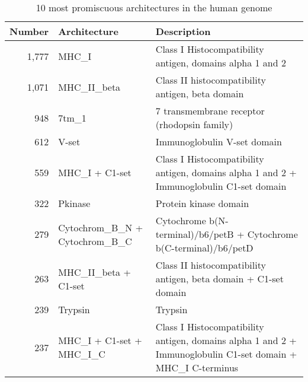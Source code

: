\begin{table}
	\begin{center}
		\sf
		\begin{tabular}{r p{} p{}}
			\textbf{Number} & \textbf{Architecture} & \textbf{Description} \\
			\hline
			1,777  & MHC\_I          & Class I Histocompatibility antigen, domains alpha 1 and 2 \\ 
			1,071  & MHC\_II\_beta    & Class II histocompatibility antigen, beta domain          \\ 
			948   & 7tm\_1          & 7 transmembrane receptor (rhodopsin family)               \\ 
			612   & V-set          & Immunoglobulin V-set domain                               \\ 
			559   & MHC\_I + C1-set &         Class I Histocompatibility antigen, domains alpha 1 and 2 + \newline Immunoglobulin C1-set domain                                                     \\ 
			322   & Pkinase        & Protein kinase domain                                     \\ 
			279   & Cytochrom\_B\_N  + \newline Cytochrom\_B\_C & Cytochrome b(N-terminal)/b6/petB + \newline Cytochrome b(C-terminal)/b6/petD                                                    \\ 
			263   & MHC\_II\_beta + C1-set & Class II histocompatibility antigen, beta domain + \newline C1-set domain                                                    \\ 
			239   & Trypsin        &  Trypsin                                                   \\ 
			237   & MHC\_I + C1-set + \newline MHC\_I\_C & Class I Histocompatibility antigen, domains alpha 1 and 2 + \newline Immunoglobulin C1-set domain + \newline MHC\_I C-terminus                                                    \\ 
			\hline
		\end{tabular}
		\caption{10 most promiscuous architectures in the human genome}
	\end{center}
\end{table}


